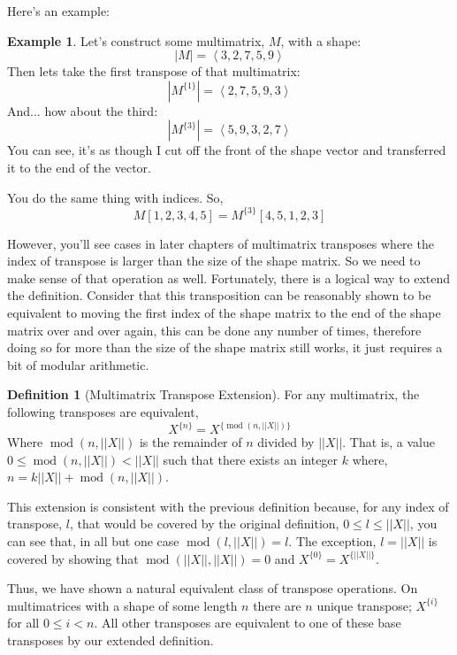 \documentclass[12pt]{book}
\theoremstyle{plain}
\theoremstyle{definition}
\newtheorem{definition}{Definition}[chapter]
\newtheorem{example}{Example}[chapter]
\theoremstyle{ppart}
\theoremstyle{case}
\theoremstyle{solution}
\DeclareMathOperator{\remainder}{mod}
\newcommand{\shape}[1]{\left|#1\right|}
\newcommand{\transpose}[2]{{#1}^{\{#2\}}}
\begin{document}
Here's an example:

\begin{example}
Let's construct some multimatrix, $M$, with a shape:
\[ \shape{M} = \left<3,2,7,5,9\right> \]
Then lets take the first transpose of that
multimatrix:
\[ \shape{\transpose{M}{1}} = \left<2,7,5,9,3\right> \]
And... how about the third:
\[ \shape{\transpose{M}{3}} = \left<5,9,3,2,7\right> \]
You can see, it's as though I cut off the front of the shape vector and transferred
it to the end of the vector.

You do the same thing with indices. So,
\[ M[1,2,3,4,5] = \transpose{M}{3}[4,5,1,2,3] \]
\end{example}

However, you'll see cases in later chapters of multimatrix transposes where
the index of transpose is larger than the size of the shape matrix. So we need
to make sense of that operation as well. Fortunately, there is a logical way
to extend the definition. Consider that this transposition can be reasonably
shown to be equivalent to moving the first index of the shape matrix
to the end of the shape matrix over and over again, this can be done any number
of times, therefore doing so for more than the size of the shape matrix still works,
it just requires a bit of modular arithmetic.

\begin{definition}[Multimatrix Transpose Extension]
\label{tran_ext}
For any multimatrix, the following transposes are equivalent,
\[ \transpose{X}{n} = \transpose{X}{\remainder(n, \shape{\shape{X}})} \]
Where $\remainder(n, \shape{\shape{X}})$ is the remainder of $n$ divided by $\shape{\shape{X}}$.
That is, a value $0 \le \remainder(n, \shape{\shape{X}}) < \shape{\shape{X}}$ such that there exists an
integer $k$ where, $n = k\shape{\shape{X}} + \remainder(n, \shape{\shape{X}})$.
\end{definition}

This extension is consistent with the previous definition because, for any
index of transpose, $l$, that would be covered by the original definition,
$0 \le l \le \shape{\shape{X}}$, you can see that, in all but one case $\remainder(l, \shape{\shape{X}}) = l$.
The exception, $l = \shape{\shape{X}}$ is covered by showing that
$\remainder(\shape{\shape{X}}, \shape{\shape{X}}) = 0$ and $\transpose{X}{0} = \transpose{X}{\shape{\shape{X}}}$. 

Thus, we have shown a natural equivalent class \cite{book:abstract} of transpose
operations. On multimatrices with a shape of some length $n$ there are $n$ unique
transpose; $\transpose{X}{i}$ for all $0 \le i < n$. All other transposes are equivalent
to one of these base transposes by our extended definition.
\end{document}
